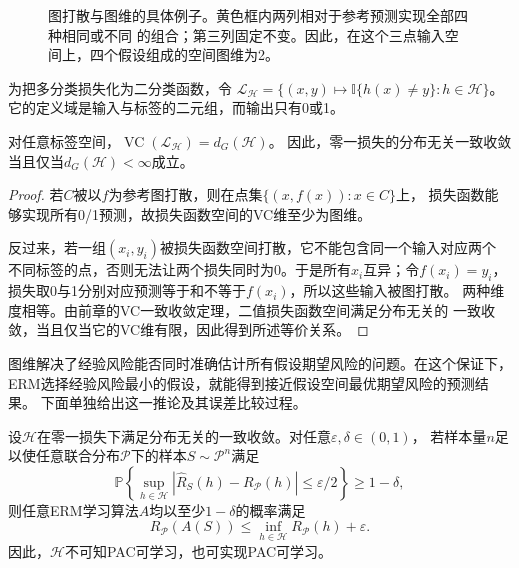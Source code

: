 \begin{figure}[htbp]
 \centering
 
 \caption{图打散与图维的具体例子。黄色框内两列相对于参考预测实现全部四种相同或不同
 的组合；第三列固定不变。因此，在这个三点输入空间上，四个假设组成的空间图维为2。}
 \label{fig:graph-shattering-concrete}
\end{figure}
\FloatBarrier

为把多分类损失化为二分类函数，令
$\mathcal L_{\mathcal H}=\{(x,y)\mapsto\mathbb I\{h(x)\neq y\}:h\in\mathcal H\}$。
它的定义域是输入与标签的二元组，而输出只有0或1。

\begin{theorem}[图维与一致收敛]
\label{thm:graph-uniform-convergence}
对任意标签空间，$\operatorname{VC}(\mathcal L_{\mathcal H})=d_G(\mathcal H)$。
因此，零一损失的分布无关一致收敛当且仅当$d_G(\mathcal H)<\infty$成立。
\end{theorem}

\begin{proof}
若$C$被以$f$为参考图打散，则在点集$\{(x,f(x)):x\in C\}$上，
损失函数能够实现所有0/1预测，故损失函数空间的VC维至少为图维。

反过来，若一组$(x_i,y_i)$被损失函数空间打散，它不能包含同一个输入对应两个
不同标签的点，否则无法让两个损失同时为0。于是所有$x_i$互异；令$f(x_i)=y_i$，
损失取0与1分别对应预测等于和不等于$f(x_i)$，所以这些输入被图打散。
两种维度相等。由前章的VC一致收敛定理，二值损失函数空间满足分布无关的
一致收敛，当且仅当它的VC维有限，因此得到所述等价关系。
\end{proof}

图维解决了经验风险能否同时准确估计所有假设期望风险的问题。在这个保证下，
ERM选择经验风险最小的假设，就能得到接近假设空间最优期望风险的预测结果。
下面单独给出这一推论及其误差比较过程。

\begin{theorem}[一致收敛推出可学习性]
\label{thm:multiclass-uniform-pac}
设$\mathcal H$在零一损失下满足分布无关的一致收敛。对任意$\varepsilon,\delta\in(0,1)$，
若样本量$n$足以使任意联合分布$\mathcal P$下的样本$S\sim\mathcal P^n$满足
\[
 \mathbb P\!\left\{
 \sup_{h\in\mathcal H}|\hat R_S(h)-R_{\mathcal P}(h)|\leq\varepsilon/2
 \right\}\geq1-\delta,
\]
则任意ERM学习算法$A$均以至少$1-\delta$的概率满足
\[
 R_{\mathcal P}(A(S))\leq\inf_{h\in\mathcal H}R_{\mathcal P}(h)+\varepsilon.
\]
因此，$\mathcal H$不可知PAC可学习，也可实现PAC可学习。
\end{theorem}

